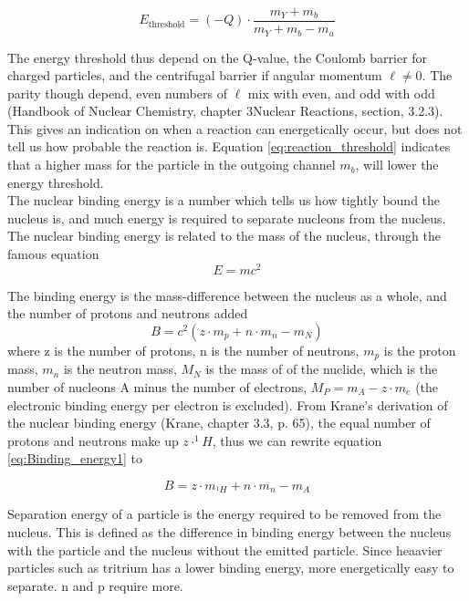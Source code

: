 \documentclass[a4paper,11pt,twoside]{book}
\begin{document}
\begin{equation} \label{eq:reaction_threshold}
    E_\text{threshold} = (-Q) \cdot \frac{m_Y +m_b}{m_Y + m_b -m_a}
\end{equation}


\noindent The energy threshold thus depend on the Q-value, the Coulomb barrier for charged particles, and the centrifugal barrier if angular momentum $\ell\neq 0$. The parity though depend, even numbers of $\ell$ mix with even, and odd with odd (Handbook of Nuclear Chemistry, chapter 3Nuclear Reactions, section, 3.2.3). This gives an indication on when a reaction can energetically occur, but does not tell us how probable the reaction is. Equation \ref{eq:reaction_threshold} indicates that a higher mass for the particle in the outgoing channel $m_b$, will lower the energy threshold.\\ 

The nuclear binding energy is a number which tells us how tightly bound the nucleus is, and much energy is required to separate nucleons from the nucleus. The nuclear binding energy is related to the mass of the nucleus, through the famous equation 
\begin{equation}
    E = mc^2
\end{equation}

\noindent 
The binding energy is the mass-difference between the nucleus as a whole, and the number of protons and neutrons added
\begin{equation} \label{eq:Binding_energy1}
    B = c^2(z\cdot m_p + n \cdot m_n - m_N)
\end{equation}
\noindent where z is the number of protons, n is the number of neutrons, $m_p$ is the proton mass, $m_n$ is the neutron mass, $M_N$ is the mass of of the nuclide, which is the number of nucleons A minus the number of electrons, $M_P = m_A - z\cdot m_e$ (the electronic binding energy per electron is excluded). From Krane's derivation of the nuclear binding energy (Krane, chapter 3.3, p. 65), the equal number of protons and neutrons make up $z\cdot^1H$, thus we can rewrite equation \ref{eq:Binding_energy1} to 

\begin{equation}
    B = z\cdot m_{^{1}H} + n\cdot m_n - m_{A}
\end{equation}

\noindent 
Separation energy of a particle is the energy required to be removed from the nucleus. This is defined as the difference in binding energy between the nucleus with the particle and the nucleus without the emitted particle. Since heaavier particles such as tritrium has a lower binding energy, more energetically easy to separate. n and p require more. 
\end{document}
